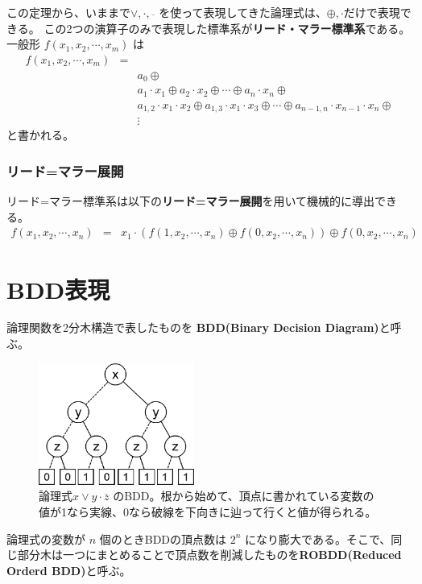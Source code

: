 \documentclass[a4j,10pt,oneside,openany,fleqn]{jsbook}
\begin{document}
この定理から、いままで$\vee, \cdot, \overline{　}$ を使って表現してきた論理式は、$\oplus, \cdot$だけで表現できる。
この2つの演算子のみで表現した標準系が\textbf{リード・マラー標準系}である。\\
一般形 $f(x_1 , x_2, \cdots , x_m)$ は
\begin{align*}
  f(x_1 , x_2, \cdots , x_m) &=& \\
  & & a_0 \oplus\\
  & &a_1 \cdot x_1 \oplus a_2 \cdot x_2 \oplus \cdots \oplus a_n \cdot x_n \oplus \\
  & &a_{1,2}\cdot x_1 \cdot x_2 \oplus a_{1,3}\cdot x_1 \cdot x_3 \oplus \cdots \oplus a_{n-1,n} \cdot x_{n-1} \cdot x_n \oplus\\
  & &\vdots
\end{align*}
と書かれる。

\subsubsection{リード=マラー展開}
リード=マラー標準系は以下の\textbf{リード=マラー展開}を用いて機械的に導出できる。
\begin{align*}
  f(x_1, x_2, \cdots, x_n) &=& {x_1 \cdot (f(1, x_2, \cdots, x_n) \oplus f(0, x_2, \cdots, x_n))} \oplus f(0, x_2, \cdots, x_n)
\end{align*}

\section{BDD表現}

論理関数を2分木構造で表したものを \textbf{BDD(Binary Decision Diagram)}と呼ぶ。

\begin{figure}[h]
  \centering\includegraphics[height=4cm]{Images/BDD.png}
  \caption{論理式$x \vee y \cdot \overline{z}$ のBDD。根から始めて、頂点に書かれている変数の値が1なら実線、0なら破線を下向きに辿って行くと値が得られる。}
\end{figure}

論理式の変数が $n$ 個のときBDDの頂点数は $2^n$ になり膨大である。そこで、同じ部分木は一つにまとめることで頂点数を削減したものを\textbf{ROBDD(Reduced Orderd BDD)}と呼ぶ。
\end{document}

